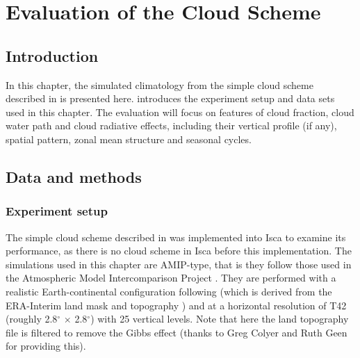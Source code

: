 \chapter{Evaluation of the Cloud Scheme}
\label{ch:eval_cld_scheme}

\section{Introduction}

In this chapter, the simulated climatology from the simple cloud scheme described in  is presented here.  introduces the experiment setup and data sets used in this chapter. The evaluation will focus on features of cloud fraction, cloud water path and cloud radiative effects, including their vertical profile (if any), spatial pattern, zonal mean structure and seasonal cycles.

\section{Data and methods}
\label{sec:exp_setup_and_dataset}

\subsection{Experiment setup}
\label{sec:eval_cld_exp_setup}
The simple cloud scheme described in  was implemented into Isca \citep{Vallis2018} to examine its performance, as there is no cloud scheme in Isca before this implementation. The simulations used in this chapter are AMIP-type, that is they follow those used in the Atmospheric Model Intercomparison Project . They are performed with a realistic Earth-continental configuration following \citet{Thomson2018} (which is derived from the ERA-Interim land mask and topography \citep{Dee2011}) and at a horizontal resolution of T42 (roughly 2.8$^\circ$ $\times$ 2.8$^\circ$) with 25 vertical levels. Note that here the land topography file is filtered to remove the Gibbs effect (thanks to Greg Colyer and Ruth Geen for providing this).

